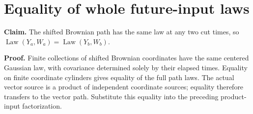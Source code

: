\documentclass[11pt,a4paper]{article}
\begin{document}
\section{\texorpdfstring{Equality of whole future-input laws}{Equality of whole future-input laws}}


\textbf{Claim.} The shifted Brownian path has the same law at any two cut times, so \(\operatorname{Law}(Y_a,W_a)=\operatorname{Law}(Y_b,W_b)\).



\textbf{Proof.} Finite collections of shifted Brownian coordinates have the same centered Gaussian law, with covariance determined solely by their elapsed times. Equality on finite coordinate cylinders gives equality of the full path laws. The actual vector source is a product of independent coordinate sources; equality therefore transfers to the vector path. Substitute this equality into the preceding product-input factorization.
\end{document}
